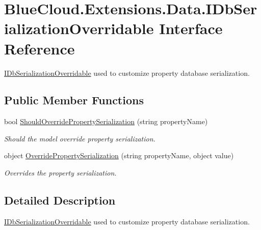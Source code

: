 \hypertarget{interface_blue_cloud_1_1_extensions_1_1_data_1_1_i_db_serialization_overridable}{}\section{Blue\+Cloud.\+Extensions.\+Data.\+I\+Db\+Serialization\+Overridable Interface Reference}
\label{interface_blue_cloud_1_1_extensions_1_1_data_1_1_i_db_serialization_overridable}


\mbox{\hyperlink{interface_blue_cloud_1_1_extensions_1_1_data_1_1_i_db_serialization_overridable}{I\+Db\+Serialization\+Overridable}} used to customize property database serialization.  


\subsection*{Public Member Functions}
\begin{DoxyCompactItemize}
\item 
bool \mbox{\hyperlink{interface_blue_cloud_1_1_extensions_1_1_data_1_1_i_db_serialization_overridable_a94558ffe1f2cc375ab8ae512bd1edee2}{Should\+Override\+Property\+Serialization}} (string property\+Name)
\begin{DoxyCompactList}\small\item\em Should the model override property serialization. \end{DoxyCompactList}\item 
object \mbox{\hyperlink{interface_blue_cloud_1_1_extensions_1_1_data_1_1_i_db_serialization_overridable_ae98330dfbf29a2d5c3d6711c6fff135f}{Override\+Property\+Serialization}} (string property\+Name, object value)
\begin{DoxyCompactList}\small\item\em Overrides the property serialization. \end{DoxyCompactList}\end{DoxyCompactItemize}


\subsection{Detailed Description}
\mbox{\hyperlink{interface_blue_cloud_1_1_extensions_1_1_data_1_1_i_db_serialization_overridable}{I\+Db\+Serialization\+Overridable}} used to customize property database serialization. 



